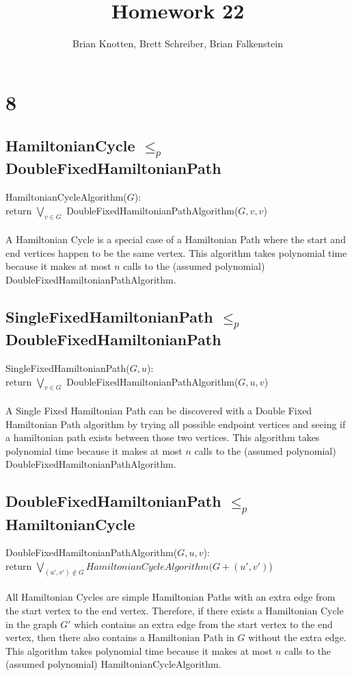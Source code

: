\documentclass[letterpaper,notitlepage,twoside]{article}
\newcommand\tab[1][1cm]{\hspace*{#1}} %
\begin{document}
\title{Homework 22}
\author{Brian Knotten, Brett Schreiber, Brian Falkenstein}
\maketitle
\section*{8}
\subsection*{HamiltonianCycle $\leq_p$ DoubleFixedHamiltonianPath}
HamiltonianCycleAlgorithm($G$):\\
\tab return $\bigvee_{v \in G}$ DoubleFixedHamiltonianPathAlgorithm($G, v, v$)
\\\\
A Hamiltonian Cycle is a special case of a Hamiltonian Path where the start and end vertices happen to be the same vertex. This algorithm takes polynomial time because it makes at most $n$ calls to the (assumed polynomial) DoubleFixedHamiltonianPathAlgorithm.

\subsection*{SingleFixedHamiltonianPath $\leq_p$ DoubleFixedHamiltonianPath}
SingleFixedHamiltonianPath($G, u$):\\
\tab return $\bigvee_{v \in G}$ DoubleFixedHamiltonianPathAlgorithm($G, u, v$)
\\\\
A Single Fixed Hamiltonian Path can be discovered with a Double Fixed Hamiltonian Path algorithm by trying all possible endpoint vertices and seeing if a hamiltonian path exists between those two vertices. This algorithm takes polynomial time because it makes at most $n$ calls to the (assumed polynomial) DoubleFixedHamiltonianPathAlgorithm.

\subsection*{DoubleFixedHamiltonianPath $\leq_p$ HamiltonianCycle}
DoubleFixedHamiltonianPathAlgorithm($G, u, v$):\\
\tab return $\bigvee_{(u', v') \notin G} HamiltonianCycleAlgorithm(G + (u', v')$)
\\\\
All Hamiltonian Cycles are simple Hamiltonian Paths with an extra edge from the start vertex to the end vertex. Therefore, if there exists a Hamiltonian Cycle in the graph $G'$ which contains an extra edge from the start vertex to the end vertex, then there also contains a Hamiltonian Path in $G$ without the extra edge. This algorithm takes polynomial time because it makes at most $n$ calls to the (assumed polynomial) HamiltonianCycleAlgorithm.
\end{document}
